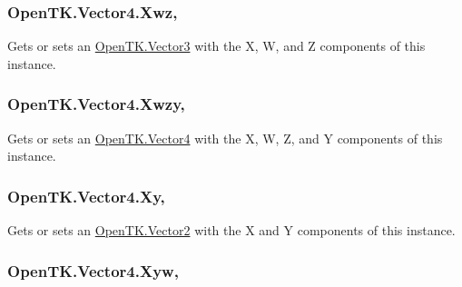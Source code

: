\hypertarget{struct_open_t_k_1_1_vector4_aec377931aad9bbeab017e5ed9b5c3f49}{
\subsubsection[{Xwz}]{ Open\-T\-K.\-Vector4.\-Xwz\hspace{0.3cm}{\ttfamily [get]}, {\ttfamily [set]}}}\label{struct_open_t_k_1_1_vector4_aec377931aad9bbeab017e5ed9b5c3f49}


Gets or sets an \hyperlink{struct_open_t_k_1_1_vector3}{Open\-T\-K.\-Vector3} with the X, W, and Z components of this instance. 

\hypertarget{struct_open_t_k_1_1_vector4_a09321872882188fd71a114c1f5230024}{
\subsubsection[{Xwzy}]{ Open\-T\-K.\-Vector4.\-Xwzy\hspace{0.3cm}{\ttfamily [get]}, {\ttfamily [set]}}}\label{struct_open_t_k_1_1_vector4_a09321872882188fd71a114c1f5230024}


Gets or sets an \hyperlink{struct_open_t_k_1_1_vector4}{Open\-T\-K.\-Vector4} with the X, W, Z, and Y components of this instance. 

\hypertarget{struct_open_t_k_1_1_vector4_ac64c71e973677fa725cc58e6b32c149d}{
\subsubsection[{Xy}]{ Open\-T\-K.\-Vector4.\-Xy\hspace{0.3cm}{\ttfamily [get]}, {\ttfamily [set]}}}\label{struct_open_t_k_1_1_vector4_ac64c71e973677fa725cc58e6b32c149d}


Gets or sets an \hyperlink{struct_open_t_k_1_1_vector2}{Open\-T\-K.\-Vector2} with the X and Y components of this instance. 

\hypertarget{struct_open_t_k_1_1_vector4_aa50a2802725d8d0cd9fefafc7166076a}{
\subsubsection[{Xyw}]{ Open\-T\-K.\-Vector4.\-Xyw\hspace{0.3cm}{\ttfamily [get]}, {\ttfamily [set]}}}\label{struct_open_t_k_1_1_vector4_aa50a2802725d8d0cd9fefafc7166076a}


